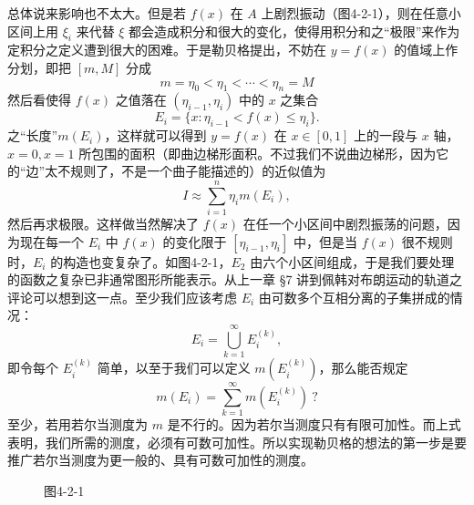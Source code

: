 总体说来影响也不太大。但是若 $f(x)$ 在 $A$ 上剧烈振动（图4-2-1），则在任意小区间上用 $\xi_i$ 来代替 $\xi$ 都会造成积分和很大的变化，使得用积分和之“极限”来作为定积分之定义遭到很大的困难。于是勒贝格提出，不妨在 $y=f(x)$ 的值域上作分划，即把 $[m,M]$ 分成
\[
 m=\eta_0<\eta_1<\cdots<\eta_n=M
\]
然后看使得 $f(x)$ 之值落在 $(\eta_{i-1},\eta_i)$ 中的 $x$ 之集合
\begin{equation}
 E_i=\{x:\eta_{i-1}<f(x)\le \eta_i\}.
 \tag{1}
\end{equation}
之“长度”$m(E_i)$，这样就可以得到 $y=f(x)$ 在 $x\in[0,1]$ 上的一段与 $x$ 轴，$x=0,x=1$ 所包围的面积（即曲边梯形面积。不过我们不说曲边梯形，因为它的“边”太不规则了，不是一个曲子能描述的）的近似值为
\begin{equation}
 I\approx\sum_{i=1}^{n}\eta_i m(E_i),
 \tag{2}
\end{equation}
然后再求极限。这样做当然解决了 $f(x)$ 在任一个小区间中剧烈振荡的问题，因为现在每一个 $E_i$ 中 $f(x)$ 的变化限于 $[\eta_{i-1},\eta_i]$ 中，但是当 $f(x)$ 很不规则时，$E_i$ 的构造也变复杂了。如图4-2-1，$E_2$ 由六个小区间组成，于是我们要处理的函数之复杂已非通常图形所能表示。从上一章 §7 讲到佩韩对布朗运动的轨道之评论可以想到这一点。至少我们应该考虑 $E_i$ 由可数多个互相分离的子集拼成的情况：
\[
 E_i=\bigcup_{k=1}^{\infty}E_i^{(k)},
\]
即令每个 $E_i^{(k)}$ 简单，以至于我们可以定义 $m(E_i^{(k)})$，那么能否规定
\[
 m(E_i)=\sum_{k=1}^{\infty}m(E_i^{(k)})\ ?
\]
至少，若用若尔当测度为 $m$ 是不行的。因为若尔当测度只有有限可加性。而上式表明，我们所需的测度，必须有可数可加性。所以实现勒贝格的想法的第一步是要推广若尔当测度为更一般的、具有可数可加性的测度。

\begin{figure}[htbp]
\centering
{}
\caption*{图4-2-1}
\end{figure}

